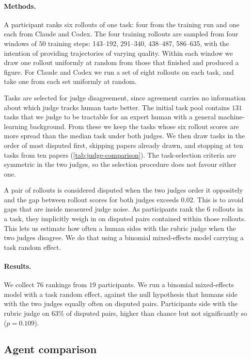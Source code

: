 \documentclass[garamond,a4paper]{inherent}
\begin{document}
\paragraph{Methods.} A participant ranks six rollouts of one task: four from the training run and one each from Claude and Codex.
The four training rollouts are sampled from four windows of $50$ training steps: 143--192, 291--340, 438--487, 586--635, with the intention of providing trajectories of varying quality. 
Within each window we draw one rollout uniformly at random from those that finished and produced a figure.
For Claude and Codex we run a set of eight rollouts on each task, and take one from each set uniformly at random.

Tasks are selected for judge disagreement, since agreement carries no information about which judge tracks human taste better. The initial task pool contains $131$ tasks that we judge to be tractable for an expert human with a general machine-learning background. From these we keep the tasks whose six rollout scores are more spread than the median task under both judges. We then draw tasks in the order of most disputed first, skipping papers already drawn, and stopping at ten tasks from ten papers (\autoref{tab:judge-comparison}).
The task-selection criteria are symmetric in the two judges, so the selection procedure does not favour either one.

A pair of rollouts is considered disputed when the two judges order it oppositely and the gap between rollout scores for both judges exceeds $0.02$. This is to avoid gaps that are inside measured judge noise. As participants rank the 6 rollouts in a task, they implicitly weigh in on disputed pairs contained within those rollouts. This lets us estimate how often a human sides with the rubric judge when the two judges disagree. We do that using a binomial mixed-effects model carrying a task random effect.

\paragraph{Results.}
We collect $76$ rankings from $19$ participants. We run a binomial mixed-effects model with a task random effect, against the null hypothesis that humans side with the two judges equally often on disputed pairs. Participants side with the rubric judge on $63\%$ of disputed pairs, higher than chance but not significantly so ($p = 0.109$).

\subsection{Agent comparison}
\label{app:agent-comparison}
\end{document}
